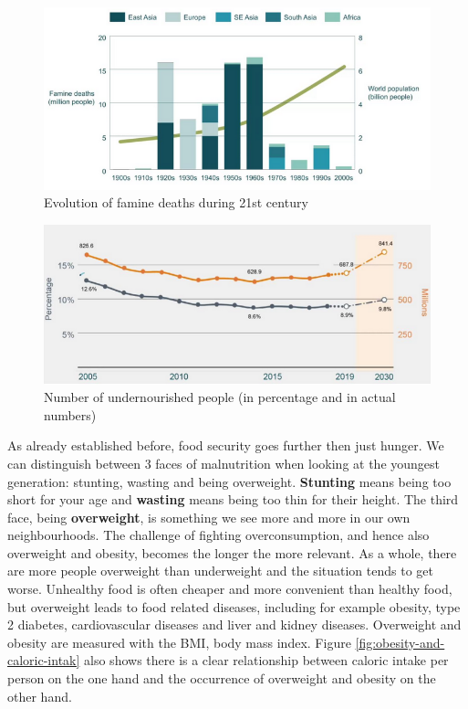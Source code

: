 \documentclass[../summary.tex]{subfiles}
\begin{document}
	\begin{figure} [htbp]
		\centering
		\includegraphics[width=1\linewidth]{images/6-famine.png}
		\caption{Evolution of famine deaths during 21st century}
		\label{fig:famine}
	\end{figure}
	
	\begin{figure} [htbp]
		\centering
		\includegraphics[width=1\linewidth]{images/6-undernourishment.png}
		\caption{Number of undernourished people (in percentage and in actual numbers)}
		\label{fig:undernourishment}
	\end{figure}
	
	As already established before, food security goes further then just hunger. We can distinguish between 3 faces of malnutrition when looking at the youngest generation: stunting, wasting and being overweight.
	\textbf{Stunting} means being too short for your age and \textbf{wasting} means being too thin for their height. The third face, being \textbf{overweight}, is something we see more and more in our own neighbourhoods. The challenge of fighting overconsumption, and hence also overweight and obesity, becomes the longer the more relevant. As a whole, there are more people overweight than underweight and the situation tends to get worse. Unhealthy food is often cheaper and more convenient than healthy food, but overweight leads to food related diseases, including for example obesity, type 2 diabetes, cardiovascular diseases and liver and kidney diseases. Overweight and obesity are measured with the BMI, body mass index. Figure \ref{fig:obesity-and-caloric-intak} also shows there is a clear relationship between caloric intake per person on the one hand and the occurrence of overweight and obesity on the other hand.
	
\end{document}
